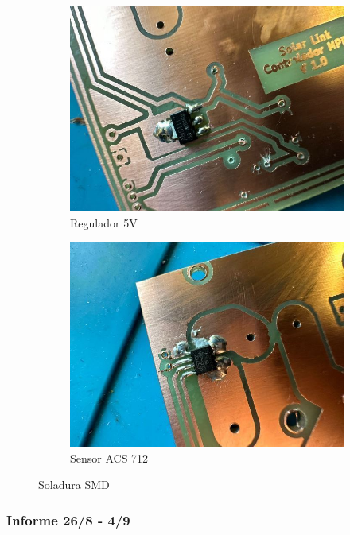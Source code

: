\begin{figure}[H]

\begin{subfigure}{0.5\textwidth}
\includegraphics[width=0.9\linewidth]{informes/IMG_8867.jpg} 
\caption{Regulador 5V}
\end{subfigure}
\begin{subfigure}{0.5\textwidth}
\includegraphics[width=0.9\linewidth]{informes/IMG_8868.jpg}
\caption{Sensor ACS 712}
\end{subfigure}

\caption{Soladura SMD}
\end{figure}


\subsubsection{Informe 26/8 - 4/9}

